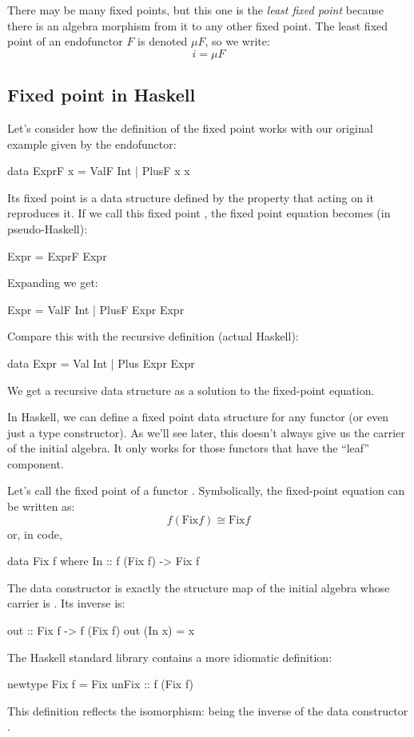 \documentclass[DaoFP]{subfiles}
\begin{document}
There may be many fixed points, but this one is the \emph{least fixed point} because there is an algebra morphism from it to any other fixed point. The least fixed point of an endofunctor $F$ is denoted $\mu F$, so we write:
\[ i = \mu F \]
\subsection{Fixed point in Haskell}
Let's consider how the definition of the fixed point works with our original example given by the endofunctor:
\begin{haskell}
data ExprF x = ValF Int | PlusF x x
\end{haskell}
Its fixed point is a data structure defined by the property that  acting on it reproduces it. If we call this fixed point , the fixed point equation becomes  (in pseudo-Haskell):
\begin{haskell}
Expr = ExprF Expr
\end{haskell}
Expanding  we get:
\begin{haskell}
Expr = ValF Int | PlusF Expr Expr
\end{haskell}
Compare this with the recursive definition (actual Haskell):
\begin{haskell}
data Expr = Val Int | Plus Expr Expr
\end{haskell}
We get a recursive data structure as a solution to the fixed-point equation.

In Haskell, we can define a fixed point data structure for any functor (or even just a type constructor). As we'll see later, this doesn't always give us the carrier of the initial algebra. It only works for those functors that have the ``leaf'' component.

Let's call  the fixed point of a functor . Symbolically, the fixed-point equation can be written as:
\[f ( \text{Fix} f) \cong  \text{Fix} f \]
or, in code,
\begin{haskell}
data Fix f where
  In :: f (Fix f) -> Fix f
\end{haskell}
The data constructor  is exactly the structure map of the initial algebra whose carrier is . Its inverse is:
\begin{haskell}
out :: Fix f -> f (Fix f)
out (In x) = x
\end{haskell}
The Haskell standard library contains a more idiomatic definition:
\begin{haskell}
newtype Fix f = Fix { unFix :: f (Fix f) }
\end{haskell}
This definition reflects the isomorphism:  being the inverse of the data constructor .
\end{document}
